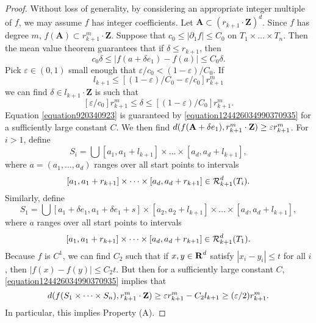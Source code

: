 \begin{proof}
    Without loss of generality, by considering an appropriate integer multiple of $f$, we may assume $f$ has integer coefficients. Let $\mathbf{A} \subset (r_{k+1} \cdot \mathbf{Z})^d$. Since $f$ has degree $m$, $f(\mathbf{A}) \subset r_{k+1}^m \cdot \mathbf{Z}$. Suppose that $c_0 \leq |\partial_1 f| \leq C_0$ on $T_1 \times \dots \times T_n$. Then the mean value theorem guarantees that if $\delta \leq r_{k+1}$, then
    \[ c_0 \delta \leq |f(a + \delta e_1) - f(a)| \leq C_0 \delta. \]
    Pick $\varepsilon \in (0,1)$ small enough that $\varepsilon/c_0 < (1 - \varepsilon)/C_0$. If
    \begin{equation} \label{equation920340923}
        l_{k+1} \leq [(1-\varepsilon)/C_0 - \varepsilon/c_0] r_{k+1}^m
    \end{equation}
    we can find $\delta \in l_{k+1} \cdot \mathbf{Z}$ is such that
    \[ [\varepsilon/c_0] r_{k+1}^m \leq \delta \leq [(1 - \varepsilon)/C_0] r_{k+1}^m. \]
    Equation \eqref{equation920340923} is guaranteed by \eqref{equation124426034990370935} for a sufficiently large constant $C$. We then find $d(f(\mathbf{A} + \delta e_1), r_{k+1}^m \cdot \operatorname{\mathbf{Z}}) \geq \varepsilon r_{k+1}^m$. For $i > 1$, define
    \[ S_i = \bigcup [a_1, a_1 + l_{k+1}] \times \dots \times [a_d, a_d + l_{k+1}], \]
    where $a = (a_1, \dots, a_d)$ ranges over all start points to intervals
    \[ [a_1,a_1 + r_{k+1}] \times \dots \times [a_d,a_d + r_{k+1}] \in \operatorname{\mathcal{R}}_{k+1}^d(T_i). \]
    Similarly, define
    \[ S_1 = \bigcup [a_1 + \delta e_1, a_1 + \delta e_1 + s] \times [a_2, a_2 + l_{k+1}] \times \dots \times [a_d, a_d + l_{k+1}], \]
    where $a$ ranges over all start points to intervals
    \[ [a_1,a_1 + r_{k+1}] \times \dots \times [a_d,a_d + r_{k+1}] \in \operatorname{\mathcal{R}}_{k+1}^d(T_1). \]
    Because $f$ is $C^1$, we can find $C_2$ such that if $x, y \in \operatorname{\mathbf{R}}^d$ satisfy $|x_i - y_i| \leq t$ for all $i$, then $|f(x) - f(y)| \leq C_2 t$. But then for a sufficiently large constant $C$, \eqref{equation124426034990370935} implies that
    \[ d(f(S_1 \times \dots \times S_n), r_{k+1}^m \cdot \operatorname{\mathbf{Z}}) \geq \varepsilon r_{k+1}^m - C_2 l_{k+1} \geq (\varepsilon/2) r_{k+1}^m. \]
    In particular, this implies Property (A).
\end{proof}


